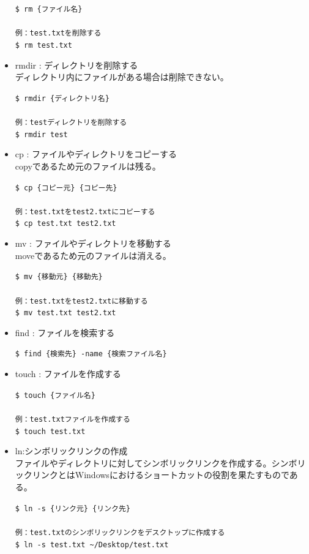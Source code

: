 \documentclass[a4paper, 11pt, dvipdfmx]{jsarticle}
\begin{document}
\begin{itemize}
\begin{terminalbox}
    \verb|$ rm {ファイル名}|\\\\
    \verb|例：test.txtを削除する|\\
    \verb|$ rm test.txt|
  \end{terminalbox}
  \item rmdir : ディレクトリを削除する\\
  ディレクトリ内にファイルがある場合は削除できない。
  \begin{terminalbox}
    \verb|$ rmdir {ディレクトリ名}|\\\\
    \verb|例：testディレクトリを削除する|\\
    \verb|$ rmdir test|
  \end{terminalbox}
  \item cp : ファイルやディレクトリをコピーする\\
  copyであるため元のファイルは残る。
  \begin{terminalbox}
    \verb|$ cp {コピー元} {コピー先}|\\\\
    \verb|例：test.txtをtest2.txtにコピーする|\\
    \verb|$ cp test.txt test2.txt|
  \end{terminalbox}
  \item mv : ファイルやディレクトリを移動する\\
  moveであるため元のファイルは消える。
  \begin{terminalbox}
    \verb|$ mv {移動元} {移動先}|\\\\
    \verb|例：test.txtをtest2.txtに移動する|\\
    \verb|$ mv test.txt test2.txt|
  \end{terminalbox}
  \item find : ファイルを検索する
  \begin{terminalbox}
    \verb|$ find {検索先} -name {検索ファイル名}|
  \end{terminalbox}
  \item touch : ファイルを作成する
  \begin{terminalbox}
    \verb|$ touch {ファイル名}|\\\\
    \verb|例：test.txtファイルを作成する|\\
    \verb|$ touch test.txt|
  \end{terminalbox}
  \item ln:シンボリックリンクの作成\\
  ファイルやディレクトリに対してシンボリックリンクを作成する。シンボリックリンクとはWindowsにおけるショートカットの役割を果たすものである。
  \begin{terminalbox}
    \verb|$ ln -s {リンク元} {リンク先}|\\\\
    \verb|例：test.txtのシンボリックリンクをデスクトップに作成する|\\
    \verb|$ ln -s test.txt ~/Desktop/test.txt|
  \end{terminalbox}
\end{itemize}
\end{document}
